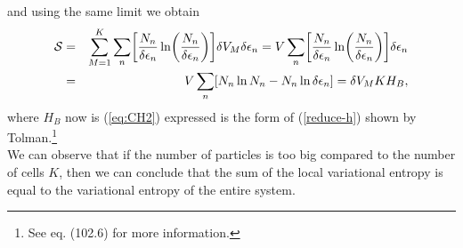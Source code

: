 and using the same limit we obtain
\begin{eqnarray}
    \Ss&=& \sum_{M=1}^{K} \sum_n
    \left[  
           \frac{N_{n}}{ \delta \epsilon_{n}} \ln 
           \left( 
                  \frac{N_{n}}{ \delta \epsilon_{n}}
           \right)
    \right]  \de V_M \delta \epsilon_{n} = V \sum_n
    \left[  
           \frac{N_{n}}{ \delta \epsilon_{n}} \ln 
           \left( 
                  \frac{N_{n}}{ \delta \epsilon_{n}}
           \right)
    \right] \delta \epsilon_{n} \nonumber \\
    &=& V \sum_n \left[N_n \ln N_n - N_n \ln \delta \epsilon_n  \right]=\de V_M K H_{B},\label{h-quantic4}
\end{eqnarray}
where $H_{B}$ now is (\ref{eq:CH2}) expressed is the form of (\ref{reduce-h}) shown by Tolman.\footnote{See \cite{bib:tolman} eq. (102.6) for more information.}\\
We can observe that if the number of particles is too big compared to the number of cells $K$, then we can conclude that the sum of the local variational entropy is equal to the variational entropy of the entire system.

